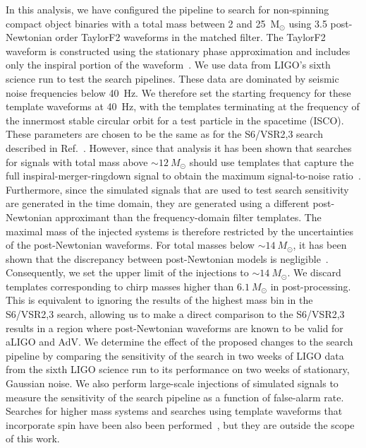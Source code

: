 \documentclass[12pt]{iopart} \usepackage{graphicx,amssymb}
\begin{document}
In this analysis, we have configured the pipeline to search for non-spinning
compact object binaries with a total mass between 2 and 25\ M$_{\odot}$ using
3.5 post-Newtonian order TaylorF2 waveforms in the matched filter. The
TaylorF2 waveform is constructed using the stationary phase approximation and
includes only the inspiral portion of the waveform~\cite{Droz:1999qx}.  We use
data from LIGO's sixth science run to test the search pipelines. These data
are dominated by seismic noise frequencies below 40~Hz. We therefore set the
starting frequency for these template waveforms at 40~Hz, with the templates
terminating at the frequency of the innermost stable circular orbit for a test
particle in the spacetime (ISCO). These parameters are chosen to be the same
as for the S6/VSR2,3 search described in Ref.~\cite{Abadie:2011nz}. However,
since that analysis it has been shown that searches for signals with total
mass above $\sim 12\ M_\odot$ should use templates that capture the full
inspiral-merger-ringdown signal to obtain the maximum signal-to-noise
ratio~\cite{Brown:2012nn}. Furthermore, since the simulated signals that are used to test search
sensitivity are generated in the time domain, they are generated using a different
post-Newtonian approximant than the frequency-domain filter templates. The
maximal mass of the injected systems is therefore restricted by the
uncertainties of the post-Newtonian waveforms. For total masses below $\sim
14\ M_\odot$, it has been shown that the discrepancy between post-Newtonian
models is negligible~\cite{Buonanno:2009zt}. Consequently, we set the upper
limit of the injections to $\sim 14\ M_\odot$. We discard templates
corresponding to chirp masses higher than $6.1 \ M_\odot$ in post-processing.
This is equivalent to ignoring the results of the highest mass bin in the
S6/VSR2,3 search, allowing us to make a direct comparison to the S6/VSR2,3
results in a region where post-Newtonian waveforms are known to be valid for
aLIGO and AdV.  We determine the effect of the proposed changes to the search
pipeline by comparing the sensitivity of the search in two weeks of LIGO data
from the sixth LIGO science run to its performance on two weeks of stationary,
Gaussian noise. We also perform large-scale injections of simulated signals to
measure the sensitivity of the search pipeline as a function of false-alarm
rate. Searches for higher mass systems and searches using template waveforms
that incorporate spin have been also been
performed~\cite{Abbott:2007ai,Abadie:2011kd,Aasi:2012rja,Privitera:2013xza,Canton:2014ena},
but they are outside the scope of this work. 
\end{document}
